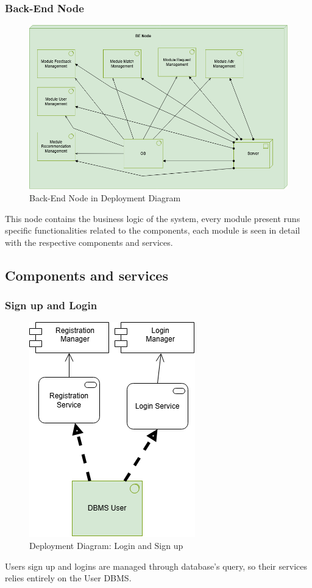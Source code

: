 \subsubsection{Back-End Node}
\begin{figure}[H]
    \centering
    \includegraphics[width=15cm]{images/architectural design/deployment/depl-be.drawio.png}
    \caption{Back-End Node in Deployment Diagram}
\end{figure}
This node contains the business logic of the system, every module present runs specific functionalities related to the components, each module is seen in detail with the respective components and services. 
\subsection{Components and services}
\subsubsection{Sign up and Login}
\begin{figure}[H]
    \centering
    \includegraphics[width=0.25\linewidth]{images/architectural design/deployment/depl-login-signup.drawio.png}
    \caption{Deployment Diagram: Login and Sign up}
\end{figure}
Users sign up and logins are managed through database's query, so their services relies entirely on the User DBMS.
